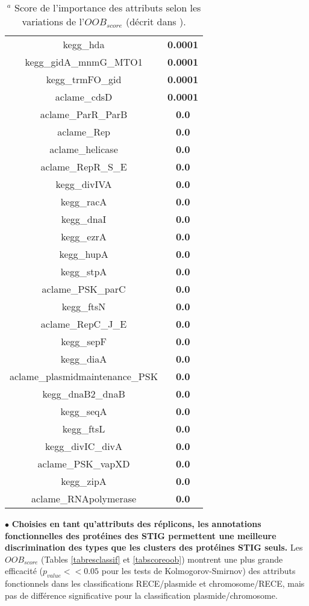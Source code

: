 \begin{table}[H]
\begin{minipage}[t]{0.3\textwidth}
\begin{scriptsize}
\begin{tabular}{c>{\bfseries}c}
kegg\_hda&0.0001\\
kegg\_gidA\_mnmG\_MTO1&0.0001\\
kegg\_trmFO\_gid&0.0001\\
aclame\_cdsD&0.0001\\
aclame\_ParR\_ParB&0.0\\
aclame\_Rep&0.0\\
aclame\_helicase&0.0\\
aclame\_RepR\_S\_E&0.0\\
kegg\_divIVA&0.0\\
kegg\_racA&0.0\\
kegg\_dnaI&0.0\\
kegg\_ezrA&0.0\\
kegg\_hupA&0.0\\
kegg\_stpA&0.0\\
aclame\_PSK\_parC&0.0\\
kegg\_ftsN&0.0\\
aclame\_RepC\_J\_E&0.0\\
kegg\_sepF&0.0\\
kegg\_diaA&0.0\\
aclame\_plasmidmaintenance\_PSK&0.0\\
kegg\_dnaB2\_dnaB&0.0\\
kegg\_seqA&0.0\\
kegg\_ftsL&0.0\\
kegg\_divIC\_divA&0.0\\
aclame\_PSK\_vapXD&0.0\\
kegg\_zipA&0.0\\
aclame\_RNApolymerase&0.0\\
\end{tabular}
\end{scriptsize}
\end{minipage}
\caption*{$^{a}$ Score de l'importance des attributs selon les variations de l'$OOB_{score}$ (décrit dans \citep{Breiman2001}).}
\end{table}

$\bullet$ \textbf{Choisies en tant qu'attributs des réplicons, les annotations fonctionnelles des protéines des STIG permettent une meilleure discrimination des types que les clusters des protéines STIG seuls.} Les $OOB_{score}$  (Tables \ref{tabresclassif} et \ref{tabscoreoob}) montrent une plus grande efficacité ($p_{value}<<0.05$ pour les tests de Kolmogorov-Smirnov) des attributs fonctionnels dans les classifications RECE/plasmide et chromosome/RECE, mais pas de différence significative pour la classification plasmide/chromosome. 

